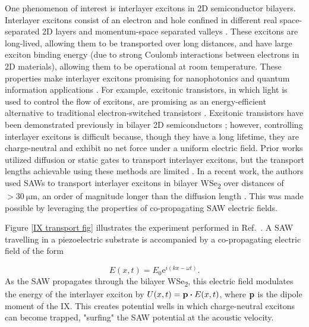 \documentclass[double,12pt,1in,seploa]{beavtex}
\begin{document}
One phenomenon of interest is interlayer excitons in 2D semiconductor bilayers. Interlayer excitons consist of an electron and hole confined in different real space-separated 2D layers and momentum-space separated valleys \cite{rivera_interlayer_2018}. These excitons are long-lived, allowing them to be transported over long distances, and have large exciton binding energy (due to strong Coulomb interactions between electrons in 2D materials), allowing them to be operational at room temperature. These properties make interlayer excitons promising for nanophotonics and quantum information applications \cite{tran_evidence_2019}. For example, excitonic transistors, in which light is used to control the flow of excitons, are promising as an energy-efficient alternative to traditional electron-switched transistors \cite{kuznetsova_all-optical_2010}. Excitonic transistors have been demonstrated previously in bilayer 2D semiconductors \cite{liu_electrically_2020}; however, controlling interlayer excitons is difficult because, though they have a long lifetime, they are charge-neutral and exhibit no net force under a uniform electric field. Prior works utilized diffusion or static gates to transport interlayer excitons, but the transport lengths achievable using these methods are limited \cite{jauregui_electrical_2019,unuchek_room-temperature_2018,liu_electrically_2020}. In a recent work, the authors used SAWs to transport interlayer excitons in bilayer WSe\textsubscript{2} over distances of $> \SI{30}{\micro\meter}$, an order of magnitude longer than the diffusion length \cite{peng_long-range_2022}. This was made possible by leveraging the properties of co-propagating SAW electric fields.

Figure \ref{IX transport fig} illustrates the experiment performed in Ref.\ \cite{peng_long-range_2022}. A SAW travelling in a piezoelectric substrate is accompanied by a co-propagating electric field of the form

\begin{equation}
    E(x, t) = E_0 \mathrm{e}^{i(kx - \omega t)}. 
\end{equation}
As the SAW propagates through the bilayer WSe\textsubscript{2}, this electric field modulates the energy of the interlayer exciton by $U(x,t) = \vectorbold{p} \dotproduct E(x,t)$, where $\vectorbold{p}$ is the dipole moment of the IX. This creates potential wells in which charge-neutral excitons can become trapped, "surfing" the SAW potential at the acoustic velocity.
\end{document}

